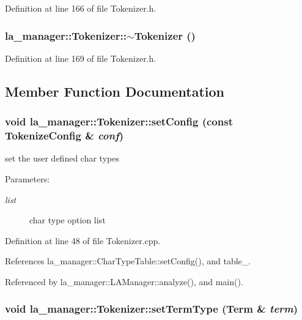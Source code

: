 Definition at line 166 of file Tokenizer.h.\hypertarget{classla__manager_1_1Tokenizer_25453b9cefb4836f76778bf5ee8f7af8}{
\subsubsection[{$\sim$Tokenizer}]{\setlength{\rightskip}{0pt plus 5cm}la\_\-manager::Tokenizer::$\sim$Tokenizer ()}}
\label{classla__manager_1_1Tokenizer_25453b9cefb4836f76778bf5ee8f7af8}




Definition at line 169 of file Tokenizer.h.

\subsection{Member Function Documentation}
\hypertarget{classla__manager_1_1Tokenizer_f5280871ecc5653b41a385bd45579d28}{
\subsubsection[{setConfig}]{\setlength{\rightskip}{0pt plus 5cm}void la\_\-manager::Tokenizer::setConfig (const {\bf TokenizeConfig} \& {\em conf})}}
\label{classla__manager_1_1Tokenizer_f5280871ecc5653b41a385bd45579d28}


set the user defined char types 

\begin{Desc}
\item[Parameters:]
\begin{description}
\item[{\em list}]char type option list \end{description}
\end{Desc}


Definition at line 48 of file Tokenizer.cpp.

References la\_\-manager::CharTypeTable::setConfig(), and table\_\-.

Referenced by la\_\-manager::LAManager::analyze(), and main().\hypertarget{classla__manager_1_1Tokenizer_fa10acb0f5ca1e0227d88a159d790bd7}{
\subsubsection[{setTermType}]{\setlength{\rightskip}{0pt plus 5cm}void la\_\-manager::Tokenizer::setTermType ({\bf Term} \& {\em term})}}
\label{classla__manager_1_1Tokenizer_fa10acb0f5ca1e0227d88a159d790bd7}




